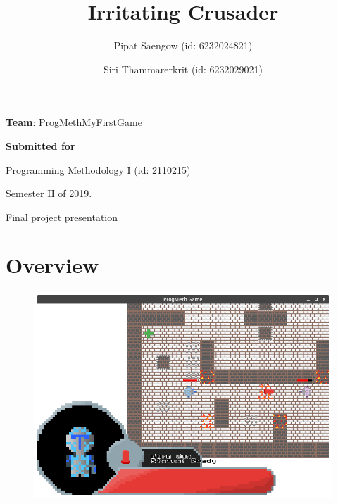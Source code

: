 \documentclass{article}
\title{Irritating Crusader}
\author{Pipat Saengow (id: 6232024821) \and Siri Thammarerkrit (id: 6232029021) }
\begin{document}
\vfill

\begin{LARGE}
\maketitle	
\end{LARGE}
	

	
\begin{center}

\large

\textbf{Team}: ProgMethMyFirstGame

\vspace{3cm}
	
\textbf{Submitted for}

Programming Methodology I (id: 2110215)

Semester II of 2019.

Final project presentation

\end{center}

\vfill

\pagebreak

\vfill
\tableofcontents
\vfill
\pagebreak

\hypertarget{overview}{%
\section{Overview}\label{overview}}

\begin{figure}
	\includegraphics[width=\linewidth]{docasset/shot}
\end{figure}
\end{document}
